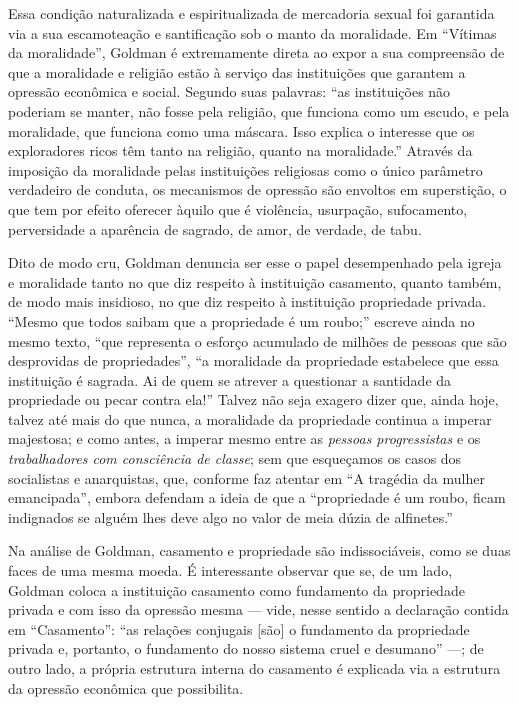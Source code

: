 Essa condição naturalizada e espiritualizada de mercadoria
sexual foi garantida via a sua escamoteação e santificação sob o manto
da moralidade. Em ``Vítimas da moralidade'', Goldman é extremamente
direta ao expor a sua compreensão de que a moralidade e religião estão à
serviço das instituições que garantem a opressão econômica e social.
Segundo suas palavras: ``as instituições não poderiam se manter, não
fosse pela religião, que funciona como um escudo, e pela moralidade, que
funciona como uma máscara. Isso explica o interesse que os exploradores
ricos têm tanto na religião, quanto na moralidade.'' Através da
imposição da moralidade pelas instituições religiosas como o único
parâmetro verdadeiro de conduta, os mecanismos de opressão são envoltos
em superstição, o que tem por efeito oferecer àquilo que é violência,
usurpação, sufocamento, perversidade a aparência de sagrado, de amor, de
verdade, de tabu. 

Dito de modo cru, Goldman denuncia ser esse o papel
desempenhado pela igreja e moralidade tanto no que diz respeito à
instituição casamento, quanto também, de modo mais insidioso, no que diz
respeito à instituição propriedade privada. ``Mesmo que todos saibam que
a propriedade é um roubo;'' escreve ainda no mesmo texto,
``que representa o esforço acumulado de milhões de pessoas que são
desprovidas de propriedades'', ``a moralidade da propriedade estabelece
que essa instituição é sagrada. Ai de quem se atrever a questionar a
santidade da propriedade ou pecar contra ela!'' Talvez não seja exagero
dizer que, ainda hoje, talvez até mais do que nunca, a moralidade da
propriedade continua a imperar majestosa; e como antes, a imperar mesmo
entre as \textit{pessoas progressistas} e os \textit{trabalhadores com consciência
de classe}; sem que esqueçamos os casos dos socialistas e anarquistas,
que, conforme faz atentar em ``A tragédia da mulher emancipada'', embora
defendam a ideia de que a ``propriedade é um roubo, ficam indignados se
alguém lhes deve algo no valor de meia dúzia de alfinetes.''

Na análise de Goldman, casamento e propriedade são indissociáveis, como
se duas faces de uma mesma moeda. É interessante observar que se,
de um lado, Goldman coloca a instituição casamento como
fundamento da propriedade privada e com isso da opressão mesma --- vide,
nesse sentido a declaração contida em ``Casamento'': ``as relações
conjugais {[}são{]} o fundamento da propriedade privada e, portanto, o
fundamento do nosso sistema cruel e desumano'' ---; de outro lado,
a própria estrutura interna do casamento é explicada via a estrutura da
opressão econômica que possibilita. 

